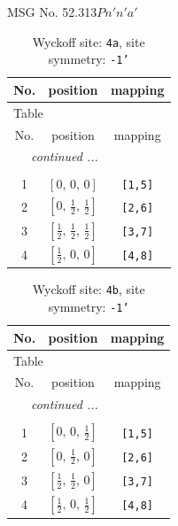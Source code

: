 \documentclass[fleqn,8pt]{jsarticle}
\begin{document}
\setcounter{MaxMatrixCols}{32}

\renewcommand{\tablename}{Table~}
\renewcommand{\figurename}{Figure~}
\begin{center}
\LARGE
MSG No. 52.313\quad$Pn'n'a'$
\end{center}
\renewcommand{\arraystretch}{1.2}
\begin{longtable}{ccc}
\caption{Wyckoff site: {\tt 4a}, site symmetry: {\tt -1'}}
 \\
 \hline \hline
No. & position & mapping \\ \hline \endfirsthead

\multicolumn{2}{l}{\tablename\ \thetable{}} \\
 \hline \hline
No. & position & mapping \\ \hline \endhead

 \hline \hline
\multicolumn{2}{r}{\footnotesize\it continued ...} \\ \endfoot

 \hline \hline
\multicolumn{2}{r}{} \\ \endlastfoot

1 & $\left[ 0,\, 0,\, 0 \right]$ & {\tt [1,5]} \\ \hline
2 & $\left[ 0,\, \frac{1}{2},\, \frac{1}{2} \right]$ & {\tt [2,6]} \\ \hline
3 & $\left[ \frac{1}{2},\, \frac{1}{2},\, \frac{1}{2} \right]$ & {\tt [3,7]} \\ \hline
4 & $\left[ \frac{1}{2},\, 0,\, 0 \right]$ & {\tt [4,8]} \\
\end{longtable}
\renewcommand{\arraystretch}{1.2}
\begin{longtable}{ccc}
\caption{Wyckoff site: {\tt 4b}, site symmetry: {\tt -1'}}
 \\
 \hline \hline
No. & position & mapping \\ \hline \endfirsthead

\multicolumn{2}{l}{\tablename\ \thetable{}} \\
 \hline \hline
No. & position & mapping \\ \hline \endhead

 \hline \hline
\multicolumn{2}{r}{\footnotesize\it continued ...} \\ \endfoot

 \hline \hline
\multicolumn{2}{r}{} \\ \endlastfoot

1 & $\left[ 0,\, 0,\, \frac{1}{2} \right]$ & {\tt [1,5]} \\ \hline
2 & $\left[ 0,\, \frac{1}{2},\, 0 \right]$ & {\tt [2,6]} \\ \hline
3 & $\left[ \frac{1}{2},\, \frac{1}{2},\, 0 \right]$ & {\tt [3,7]} \\ \hline
4 & $\left[ \frac{1}{2},\, 0,\, \frac{1}{2} \right]$ & {\tt [4,8]} \\
\end{longtable}
\end{document}
